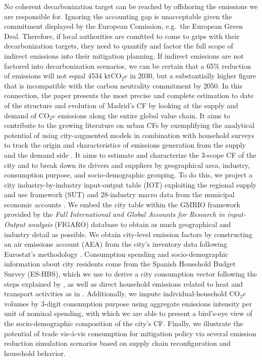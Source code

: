 \documentclass[
  10pt,
  twocolumn]{aft}
\begin{document}
No coherent decarbonization target can be reached by offshoring the
emissions we are responsible for. Ignoring the accounting gap is
unacceptable given the commitment displayed by the European Comission,
e.g.~the European Green Deal. Therefore, if local authorities are
comitted to come to grips with their decarbonization targets, they need
to quantify and factor the full scope of indirect emissions into their
mitigation planning. If indirect emissions are not factored into
decarbonization scenarios, we can be certain that a 65\% reduction of
emissions will not equal 4534 \(\text{ktCO}_2e\) in 2030, but a
substantially higher figure that is incompatible with the carbon
neutrality commitment by 2050. In this connection, the paper presents
the most precise and complete estimation to date of the structure and
evolution of Madrid's CF by looking at the supply and demand of
\(\text{CO}_2e\) emissions along the entire global value chain. It aims
to contribute to the growing literature on urban CFs by exemplifying the
analytical potential of using city-augmented models in combination with
household surveys to track the origin and characteristics of emissions
generation from the supply and the demand side
\citep{wiedmann_city_2021, chen_urban_2020, moran_carbon_2018, c40_consumption-based_2018}.
It aims to estimate and characterize the 3-scope CF of the city and to
break down its drivers and suppliers by geographical area, industry,
consumption purpose, and socio-demographic grouping. To do this, we
project a city industry-by-industry input-output table (IOT) exploiting
the regional supply and use framework (SUT) and 28-industry macro data
from the municipal economic accounts \citep{am_areas_2023}. We embed the
city table within the GMRIO framework provided by the \emph{Full
International and Global Accounts for Research in input-Output analysis}
(FIGARO) database \citep{remond-tiedrez_eu_2019} to obtain as much
geographical and industry detail as possible. We obtain city-level
emission factors by constructing an air emissions account (AEA) from the
city's inventory data \citep{am_inventario_2021} following Eurostat's
methodology \citep{eurostat_manual_2015, eurostat_european_2013}.
Consumption spending and socio-demographic information about city
residents come from the Spanish Household Budget Survey (ES-HBS), which
we use to derive a city consumption vector following the steps explained
by \citet{cazcarro_linking_2022}, as well as direct household emissions
related to heat and transport activities as in
\citet{corcoles_carbon_2024}. Additionally, we impute
individual-household \(\text{CO}_2e\) volumes by 3-digit consumption
purpose using aggregate emissions intensity per unit of nominal
spending, with which we are able to present a bird's-eye view of the
socio-demographic composition of the city's CF. Finally, we illustrate
the potential of trade vis-à-vis consumption for mitigation policy via
several emission reduction simulation scenarios based on supply chain
reconfiguration and household behavior.
\end{document}

